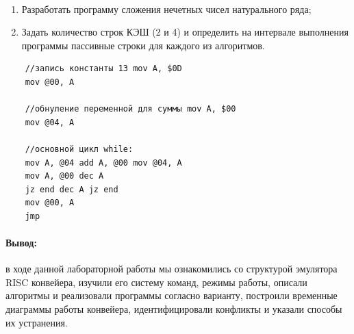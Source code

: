 \documentclass[a4paper,14pt]{extarticle}
\begin{document}
\begin{problem*}{~}

	\begin{enumerate}
		\item Разработать программу сложения нечетных чисел натурального ряда;
		\item Задать количество строк КЭШ (2 и 4) и определить на интервале выполнения программы пассивные строки для каждого из алгоритмов.
	\end{enumerate}

\nonum 

\begin{lstlisting}
	//запись константы 13 mov A, $0D
	mov @00, A
	
	//обнуление переменной для суммы mov A, $00
	mov @04, A
	
	//основной цикл while:
	mov A, @04 add A, @00 mov @04, A
	mov A, @00 dec A
	jz end dec A jz end
	mov @00, A
	jmp 
\end{lstlisting}

\end{problem*}

\paragraph{Вывод:}

в ходе данной лабораторной работы мы ознакомились со структурой эмулятора RISC конвейера, изучили его систему команд, режимы работы, описали алгоритмы и реализовали программы согласно варианту, построили временные диаграммы работы конвейера, идентифицировали конфликты и указали способы их устранения.
\end{document}
